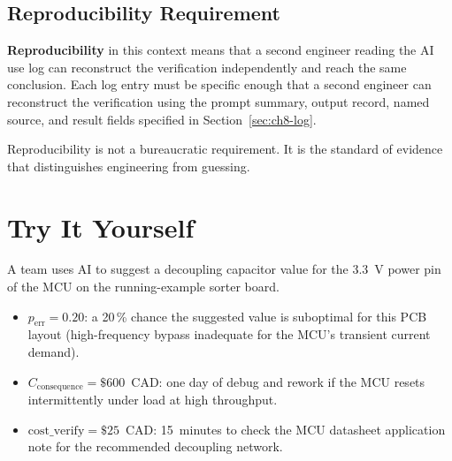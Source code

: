 \subsection{Reproducibility Requirement}
\label{sec:ch8-reproducibility}

\textbf{Reproducibility} in this context means that a
second engineer reading the AI use log can reconstruct the verification
independently and reach the same conclusion.
Each log entry must be specific enough that a second engineer can reconstruct
the verification using the prompt summary, output record, named source, and
result fields specified in Section~\ref{sec:ch8-log}.

Reproducibility is not a bureaucratic requirement.
It is the standard of evidence that distinguishes engineering from guessing.

\section*{Try It Yourself}

A team uses AI to suggest a decoupling capacitor value for the 3.3~V power pin
of the MCU on the running-example sorter board.

\begin{itemize}
  \item $p_{\text{err}} = 0.20$: a 20\,\% chance the suggested value is
        suboptimal for this PCB layout (high-frequency bypass inadequate for
        the MCU's transient current demand).
  \item $C_{\text{consequence}} = \$600$~CAD: one day of debug and rework if
        the MCU resets intermittently under load at high throughput.
  \item $\text{cost\_verify} = \$25$~CAD: 15~minutes to check the MCU
        datasheet application note for the recommended decoupling network.
\end{itemize}

